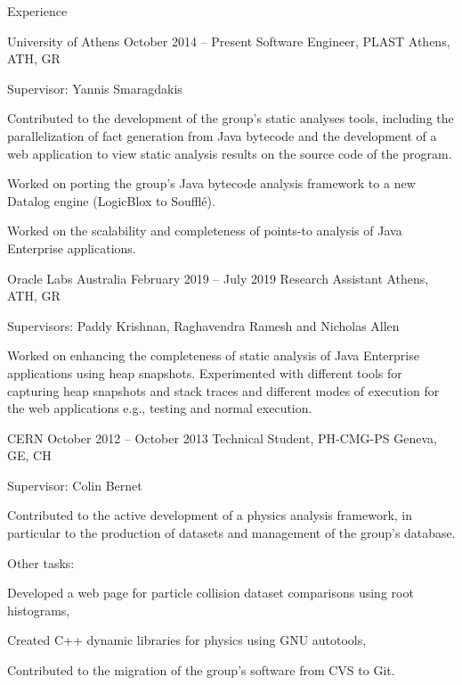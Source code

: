 \documentclass{resume}
\begin{document}
\begin{rSection}{Experience}

\begin{rSubsection}
  {University of Athens}
  {October 2014 -- Present}
  {Software Engineer, PLAST}
  {Athens, ATH, GR}
\item Supervisor: Yannis Smaragdakis
\item Contributed to the development of the group's static analyses tools, including the
  parallelization of fact generation from Java bytecode and the development
  of a web application to view static analysis results on the source code of the program.
\item Worked on porting the group's Java bytecode analysis framework to a new Datalog engine (LogicBlox to Soufflé).
\item Worked on the scalability and completeness of points-to analysis of Java Enterprise applications. 
\end{rSubsection}

\begin{rSubsection}
  {Oracle Labs Australia}
  {February 2019 -- July 2019}
  {Research Assistant}
  {Athens, ATH, GR}
\item Supervisors: Paddy Krishnan, Raghavendra Ramesh and Nicholas Allen
\item Worked on enhancing the completeness of static analysis of Java Enterprise applications using heap snapshots.
Experimented with different tools for capturing heap snapshots and stack traces and different modes of execution
for the web applications e.g., testing and normal execution.
\end{rSubsection}


\begin{rSubsection}
  {CERN}
  {October 2012 -- October 2013}
  {Technical Student, PH-CMG-PS}
  {Geneva, GE, CH}
\item Supervisor: Colin Bernet
  \item Contributed to the active development of a physics analysis framework,
  in particular to the production of datasets and management of the
  group's database.
\item Other tasks: \\
  \begin{inparaenum}[(i)]
  \item Developed a web page for particle collision dataset comparisons using root histograms, \\
  \item Created C++ dynamic libraries for physics using GNU autotools, \\
  \item Contributed to the migration of the group's software from CVS to Git.
  \end{inparaenum}
\end{rSubsection}

\end{rSection}
\end{document}

